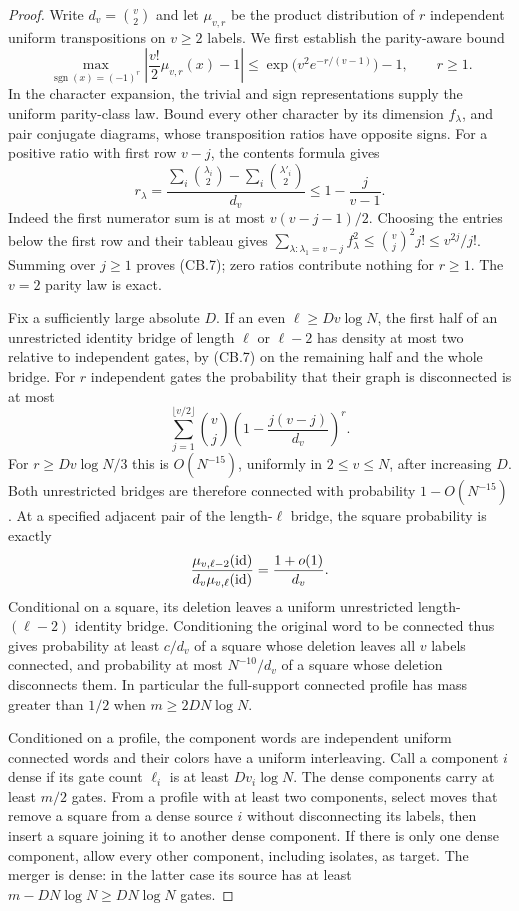 \begin{proof}
Write $d_v=\binom v2$ and let $\mu_{v,r}$ be the product distribution
of $r$ independent uniform transpositions on $v\ge2$ labels.
We first establish the parity-aware bound
\[
 \max_{\operatorname{sgn}(x)=(-1)^r}
 \left|\frac{v!}{2}\mu_{v,r}(x)-1\right|
 \le \exp\bigl(v^2e^{-r/(v-1)}\bigr)-1,\qquad r\ge1. \tag{CB.7}
\]
In the character expansion, the trivial and sign representations supply
the uniform parity-class law.  Bound every other character by its
dimension $f_\lambda$, and pair conjugate diagrams, whose transposition
ratios have opposite signs.  For a positive ratio with first row $v-j$,
the contents formula gives
\[
 r_\lambda=
 \frac{\sum_i\binom{\lambda_i}{2}-\sum_i\binom{\lambda'_i}{2}}{d_v}
 \le1-\frac j{v-1}.
\]
Indeed the first numerator sum is at most $v(v-j-1)/2$.
Choosing the entries below the first row and their tableau gives
$\sum_{\lambda:\lambda_1=v-j}f_\lambda^2
 \le\binom vj^2j!\le v^{2j}/j!$.
Summing over $j\ge1$ proves (CB.7); zero ratios contribute nothing
for $r\ge1$.  The $v=2$ parity law is exact.

Fix a sufficiently large absolute $D$.  If an even
$\ell\ge Dv\log N$, the first half of an unrestricted identity bridge
of length $\ell$ or $\ell-2$ has density at most two relative to
independent gates, by (CB.7) on the remaining half and the whole bridge.
For $r$ independent gates the probability that their graph is disconnected
is at most
\[
 \sum_{j=1}^{\lfloor v/2\rfloor}\binom vj
       \left(1-\frac{j(v-j)}{d_v}\right)^r.
\]
For $r\ge Dv\log N/3$ this is $O(N^{-15})$, uniformly in
$2\le v\le N$, after increasing $D$.  Both unrestricted bridges are
therefore connected with probability $1-O(N^{-15})$.
At a specified adjacent pair of the length-$\ell$ bridge, the square
probability is exactly
\[
 \frac{\mu_{v,\ell-2}(\mathrm{id})}{d_v\mu_{v,\ell}(\mathrm{id})}
          =\frac{1+o(1)}{d_v}.
\]
Conditional on a square, its deletion leaves a uniform unrestricted
length-$(\ell-2)$ identity bridge.  Conditioning the original word to be
connected thus gives probability at least $c/d_v$ of a square whose
deletion leaves all $v$ labels connected, and probability at most
$N^{-10}/d_v$ of a square whose deletion disconnects them.
In particular the full-support connected profile has mass greater than
$1/2$ when $m\ge2DN\log N$.

Conditioned on a profile, the component words are independent uniform
connected words and their colors have a uniform interleaving.  Call a
component $i$ dense if its gate count $\ell_i$ is at least
$Dv_i\log N$.  The dense components carry at least $m/2$ gates.
From a profile with at least two components, select moves that remove a
square from a dense source $i$ without disconnecting its labels, then
insert a square joining it to another dense component.  If there is only
one dense component, allow every other component, including isolates, as
target.  The merger is dense: in the latter case its source has at least
$m-DN\log N\ge DN\log N$ gates.


\end{proof}
